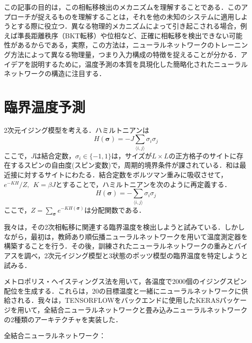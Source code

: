 \documentclass[a4paper,11pt]{jsarticle}
\begin{document}
この記事の目的は，この相転移検出のメカニズムを理解することである．このアプローチが捉えるものを理解することは，それを他の未知のシステムに適用しようとする際に役立つ．異なる物理的メカニズムによって引き起こされる場合，例えば準長距離秩序（BKT転移）や位相など、正確に相転移を検出できない可能性があるからである，実際，この方法は，ニューラルネットワークのトレーニング方法によって異なる物理量，つまり入力構成の特徴を捉えることが分かる．アイデアを説明するために，温度予測の本質を具現化した簡略化されたニューラルネットワークの構造に注目する．

\section{臨界温度予測}
2次元イジング模型を考える．ハミルトニアンは
\begin{equation}
  H(\bm{\sigma}) = - J \sum_{\langle i,j \rangle} \sigma_i \sigma_j
\end{equation}
ここで，$J$は結合定数，$\sigma_i \in \{ -1, 1 \}$は，サイズが$L \times L$の正方格子のサイトに存在するスピンの自由度(スピン変数)で，周期的境界条件が課されている．和は最近接に対するサイトにわたる．結合定数をボルツマン重みに吸収させて，$e^{-KH}/Z, \ \ K = \beta J$とすることで，ハミルトニアンを次のように再定義する．
\begin{equation}
  H(\bm{\sigma}) = - \sum_{\langle i,j \rangle} \sigma_i \sigma_j
\end{equation}
ここで，$Z = \sum_{\bm{\sigma}}e^{-KH(\bm{\sigma})}$は分配関数である．\par
我々は，その2次相転移に関連する臨界温度を検出しようと試みている．しかしながら，最初は，教師あり順伝播ニューラルネットワークを用いて温度測定器を構築することを行う．その後，訓練されたニューラルネットワークの重みとバイアスを調べ，2次元イジング模型と3状態のポッツ模型の臨界温度を特定しようと試みる．\par
メトロポリス・ヘイスティングス法を用いて，各温度で2000個のイジングスピン配位を生成する．これらは，20の目標温度と一緒にニューラルネットワークに供給される．我々は，TENSORFLOWをバックエンドに使用したKERASパッケージを用いて，全結合ニューラルネットワークと畳み込みニューラルネットワークの2種類のアーキテクチャを実装した．\par
全結合ニューラルネットワーク：
\end{document}
